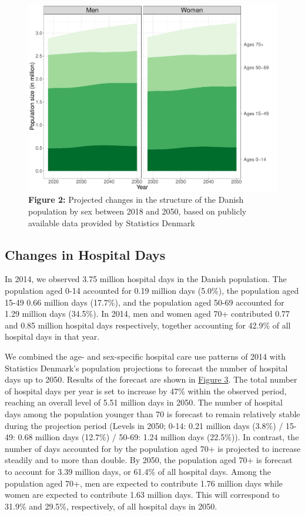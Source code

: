 	\begin{figure}[H]
		\centering
		\includegraphics[scale=0.450]{Paper_4/MAIN_Figure_2.pdf}
		\caption*{	\textbf{Figure 2:} Projected changes in the structure of the Danish 
					population by sex between 2018 and 2050, based on publicly 
					available data provided by Statistics Denmark}
	\label{ch5:fig2}
	\end{figure}


\subsection{Changes in Hospital Days}

In 2014, we observed 3.75 million hospital days in the Danish population. The 
population aged 0-14 accounted for 0.19 million days (5.0\%), the population aged 
15-49 0.66 million days (17.7\%), and the population aged 50-69 accounted for 1.29 
million days (34.5\%). In 2014, men and women aged 70+ contributed 0.77 and 0.85 
million hospital days respectively, together accounting for 42.9\% of all hospital 
days in that year.

We combined the age- and sex-specific hospital care use patterns of 2014 with 
Statistics Denmark's population projections to forecast the number of hospital 
days up to 2050. Results of the forecast are shown in \hyperref[ch5:fig3]{Figure 3}. 
The total number of hospital days per year is set to increase by 47\% within the observed 
period, reaching an overall level of 5.51 million days in 2050. The number of hospital 
days among the population younger than 70 is forecast to remain relatively stable 
during the projection period (Levels in 2050; 0-14: 0.21 million days (3.8\%) / 
15-49: 0.68 million days (12.7\%) / 50-69: 1.24 million days (22.5\%)). In contrast, 
the number of days accounted for by the population aged 70+ is projected to increase 
steadily and to more than double. By 2050, the population aged 70+ is forecast to 
account for 3.39 million days, or 61.4\% of all hospital days. Among the population 
aged 70+, men are expected to contribute 1.76 million days while women are expected 
to contribute 1.63 million days. This will correspond to 31.9\% and 29.5\%, respectively, 
of all hospital days in 2050.\\


